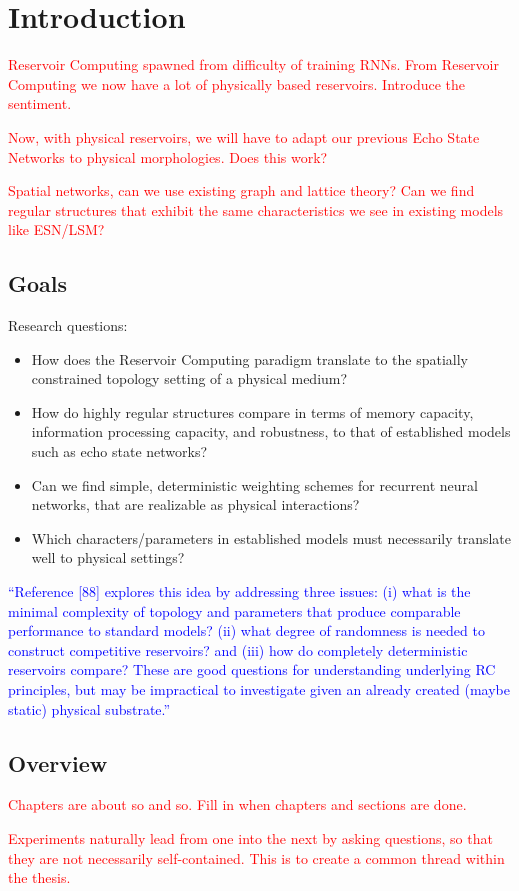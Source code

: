 \chapter{Introduction}

\textcolor{red}{
  Reservoir Computing spawned from difficulty of training RNNs. From Reservoir
Computing we now have a lot of physically based reservoirs. Introduce the
sentiment.
}

\textcolor{red}{
  Now, with physical reservoirs, we will have to adapt our previous Echo State
Networks to physical morphologies. Does this work?
}

\textcolor{red}{
  Spatial networks, can we use existing graph and lattice theory? Can we find
regular structures that exhibit the same characteristics we see in existing
models like ESN/LSM?
}

\section{Goals}

Research questions:

\begin{itemize}
\item How does the Reservoir Computing paradigm translate to the spatially
constrained topology setting of a physical medium?
\item How do highly regular structures compare in terms of memory capacity,
information processing capacity, and robustness, to that of established models
such as echo state networks?
\item Can we find simple, deterministic weighting schemes for recurrent neural
networks, that are realizable as physical interactions?
\item Which characters/parameters in established models must necessarily
translate well to physical settings?
\end{itemize}

\textcolor{blue}{
  ``Reference [88] explores this idea by addressing three issues: (i) what is
the minimal complexity of topology and parameters that produce comparable
performance to standard models?  (ii) what degree of randomness is needed to
construct competitive reservoirs? and (iii) how do completely deterministic
reservoirs compare? These are good questions for understanding underlying RC
principles, but may be impractical to investigate given an already created
(maybe static) physical substrate.''
}

\section{Overview}

\textcolor{red}{
  Chapters are about so and so. Fill in when chapters and sections are done.
}

\textcolor{red}{
  Experiments naturally lead from one into the next by asking questions, so that
they are not necessarily self-contained. This is to create a common thread
within the thesis.
}

